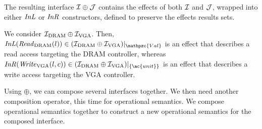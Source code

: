 The resulting interface $\mathcal{I} \oplus \mathcal{J}$ contains the effects of both $\mathcal{I}$ and
$\mathcal{J}$, wrapped into either $\mathit{InL}$ or $\mathit{InR}$ constructors, defined to
preserve the effects results sets. 
%

\begin{example}
  We consider $\mathcal{I}_{\mathrm{DRAM}} \oplus \mathcal{I}_{\mathrm{VGA}}$. Then,
  $\func{InL}(\func{Read}_{\mathrm{DRAM}}(l)) \in \Interface{(\I_{\mathrm{DRAM}}
    \oplus \I_{\mathrm{VGA}})}{\mathpzc{Val}}$ is an effect that describes a
  read access targeting the DRAM controller, whereas
  $\func{InR}(\func{Write}_{\mathrm{VGA}}(l, c)) \in
  \Interface{(\I_{\mathrm{DRAM}} \oplus \I_{\mathrm{VGA}})}{\{\ac{unit}\}}$ is
  an effect that describes a write access targeting the VGA controller. 
\end{example}

Using $\oplus$, we can compose several interfaces together.
%
We then need another composition operator, this time for operational semantics.
%
We compose operational semantics together to construct a new operational
semantics for the composed interface.

